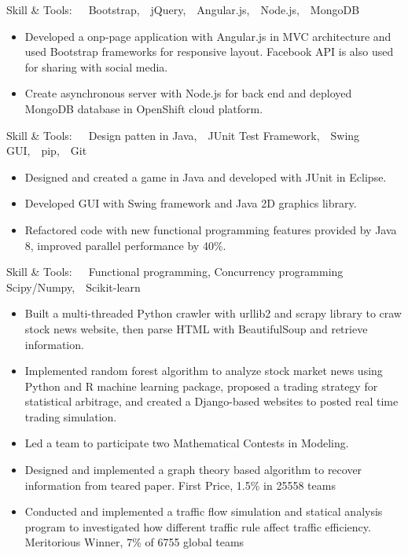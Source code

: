 \documentclass{resume}
\begin{document}
Skill \& Tools:~~~Bootstrap,~~jQuery,~~Angular.js,~~Node.js,~~MongoDB

\begin{itemize}
  \item Developed a onp-page application with Angular.js  in MVC architecture and used Bootstrap frameworks for responsive layout. Facebook  API is  also used for sharing with social media.
  \item Create asynchronous server with Node.js for back end and deployed MongoDB database in OpenShift cloud platform.
\end{itemize}

Skill \& Tools:~~~Design patten in Java,~~JUnit Test Framework,~~Swing GUI,~~pip,~~Git

\begin{itemize}
  \item Designed and created a game in Java and developed with JUnit in Eclipse.
  \item Developed GUI with Swing  framework and Java 2D graphics library.
  \item Refactored code with new functional programming features provided by Java 8, improved parallel performance by 40\%.  
\end{itemize}

Skill \& Tools:~~~Functional programming, Concurrency programming Scipy/Numpy,~~Scikit-learn

\begin{itemize}
  \item Built a multi-threaded Python crawler with urllib2 and scrapy library to craw stock news website, then parse HTML with BeautifulSoup and retrieve information.
  \item Implemented random forest algorithm to analyze stock market news using Python and R machine learning package,  proposed a trading strategy for statistical arbitrage, and created a Django-based websites to posted real time trading simulation.
\end{itemize}



\begin{itemize}
  \item Led a team to participate two Mathematical Contests in Modeling.
  \item Designed and implemented a graph theory based algorithm to recover information from teared paper. First  Price, 1.5\% in 25558 teams
    \item Conducted and implemented a traffic flow simulation and statical analysis program to investigated how different traffic rule affect traffic efficiency. Meritorious Winner,  7\% of 6755 global teams
\end{itemize}


%
\end{document}
